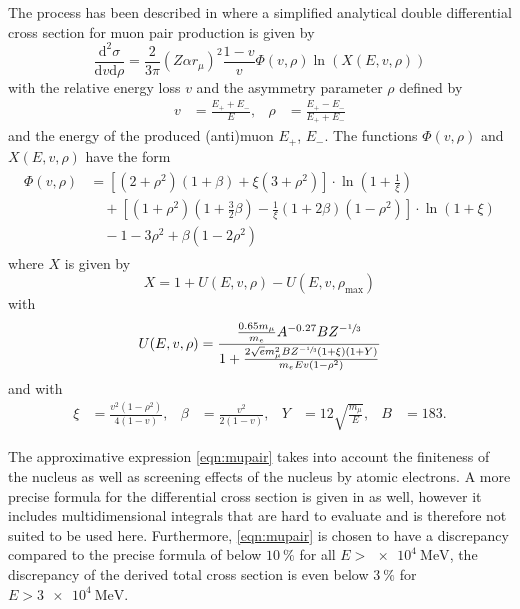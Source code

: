 The process has been described in \cite{Kelner2000} where a simplified analytical double differential cross section for muon pair production is given by
\begin{equation}
    \label{eqn:mupair}
    \frac{\mathrm{d}^2\sigma}{\mathrm{d}v \mathrm{d}\rho} = \frac{2}{3\pi} (Z \alpha r_\mu)^2 \frac{1-v}{v} \Phi(v, \rho) \ln \left( X \left(E, v, \rho \right) \right)
\end{equation}
with the relative energy loss $v$ and the asymmetry parameter $\rho$ defined by
\begin{align}
    v &= \frac{E_+ + E_-}{E}, & \rho &= \frac{E_+ - E_-}{E_+ + E_-}
\end{align}
and the energy of the produced (anti)muon $E_+$, $E_-$.
The functions $\Phi(v, \rho)$ and $X(E, v, \rho)$ have the form
\begin{align}
    \begin{split}
    \Phi(v, \rho) &= \left[ (2 + \rho^2) (1 + \beta) + \xi (3 + \rho^2) \right] \cdot \ln{ \left( 1 + \frac{1}{\xi} \right) }\\ &\quad+ \left[ (1 + \rho^2) \left( 1 + \frac{3}{2} \beta \right) - \frac{1}{\xi} (1 + 2 \beta) (1 - \rho^2) \right] \cdot \ln{ (1 + \xi) }\\ &\quad- 1 - 3 \rho^2 + \beta (1 - 2 \rho^2)
    \end{split}
\end{align}
where $X$ is given by
\begin{equation}
    X = 1 + U(E, v, \rho) - U(E, v, \rho_\text{max})
\end{equation}
with 
\begin{equation}
    U(E, v, \rho) = \frac{\frac{0.65 m_{\mu}}{m_e} A^{-0.27} B Z^{-\sfrac{1}{3}}}{1 + \frac{2 \sqrt{e} m_{\mu}^2 B Z^{-\sfrac{1}{3}} (1 + \xi) (1 + Y) }{m_e E v (1 - \rho^2)} }
\end{equation}
and with 
\begin{align}
    \xi &= \frac{v^2 (1 - \rho^2)}{4 (1 - v)}, & \beta &= \frac{v^2}{2 (1 - v)}, & Y &= 12 \sqrt{\frac{m_{\mu}}{E}}, & B &= 183.
\end{align}

The approximative expression \eqref{eqn:mupair} takes into account the finiteness of the nucleus as well as screening effects of the nucleus by atomic electrons.
A more precise formula for the differential cross section is given in \cite{Kelner2000} as well, however it includes multidimensional integrals that are hard to evaluate and is therefore not suited to be used here.
Furthermore, \eqref{eqn:mupair} is chosen to have a discrepancy compared to the precise formula of below $\SI{10}{\percent}$ for all $E > \SI{e4}{\mega\electronvolt}$, the discrepancy of the derived total cross section is even below $\SI{3}{\percent}$ for $E > \SI{3e4}{\mega\electronvolt}$.

